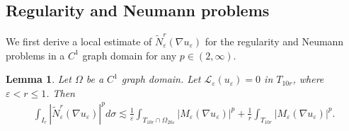 \documentclass[reqno,12pt]{amsart} %
\newtheorem{lemma}[theorem]{Lemma}
\theoremstyle{definition}
\theoremstyle{remark}
\numberwithin{equation}{section}
\newcommand{\cL}{\mathcal{L}}
\newcommand{\e}{\varepsilon}
\begin{document}
\subsection{Regularity and Neumann problems}

We first derive a local estimate of $\widetilde{N}_\e^r(\nabla u_\e)$  for the regularity and Neumann problems in a $C^1$ graph domain for any $p\in (2,\infty)$. 

\begin{lemma}\label{lem.C1Rp}
    Let $\Omega$ be a $C^1$ graph domain. Let $\cL_\e(u_\e) = 0$ in $T_{10r}$, where $\e< r\le 1$. Then
    \begin{equation}
    \begin{aligned}
    \int_{I_r} |\widetilde{N}_\e^r(\nabla u_\e)|^p d\sigma \lesssim \frac{1}{\e} \int_{T_{10r} \cap \Omega_{20\e}} |M_\e(\nabla u_\e)|^p + \frac{1}{r} \int_{T_{10r}} |M_\e(\nabla u_\e)|^p.
    \end{aligned}
\end{equation}
\end{lemma}
\end{document}
